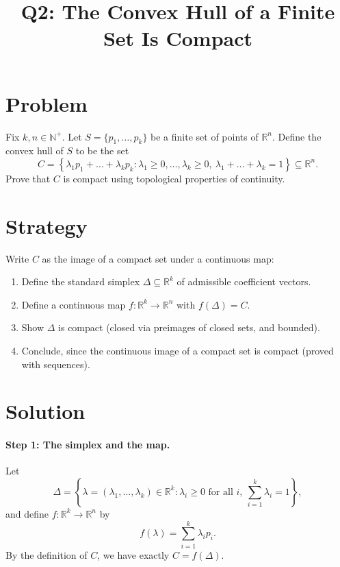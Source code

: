 \documentclass[11pt]{article}
\title{Q2: The Convex Hull of a Finite Set Is Compact}
\date{}
\newcommand{\R}{\mathbb{R}}
\newcommand{\N}{\mathbb{N}}
\begin{document}
\maketitle

\section*{Problem}

Fix $k, n \in \N^{+}$. Let $S = \{p_1, \dots, p_k\}$ be a finite set of points of $\R^n$.
Define the convex hull of $S$ to be the set
\[
  C = \left\{ \lambda_1 p_1 + \dots + \lambda_k p_k : \lambda_1 \ge 0, \dots, \lambda_k \ge 0,\ \lambda_1 + \dots + \lambda_k = 1 \right\} \subseteq \R^n .
\]
Prove that $C$ is compact using topological properties of continuity.

\section*{Strategy}

Write $C$ as the image of a compact set under a continuous map:
\begin{enumerate}
  \item Define the standard simplex $\Delta \subseteq \R^k$ of admissible coefficient vectors.
  \item Define a continuous map $f \colon \R^k \to \R^n$ with $f(\Delta) = C$.
  \item Show $\Delta$ is compact (closed via preimages of closed sets, and bounded).
  \item Conclude, since the continuous image of a compact set is compact (proved with sequences).
\end{enumerate}

\section*{Solution}

\paragraph{Step 1: The simplex and the map.}
Let
\[
  \Delta = \left\{ \lambda = (\lambda_1, \dots, \lambda_k) \in \R^k : \lambda_i \ge 0 \text{ for all } i,\ \sum_{i=1}^k \lambda_i = 1 \right\},
\]
and define $f \colon \R^k \to \R^n$ by
\[
  f(\lambda) = \sum_{i=1}^k \lambda_i p_i .
\]
By the definition of $C$, we have exactly $C = f(\Delta)$.
\end{document}
